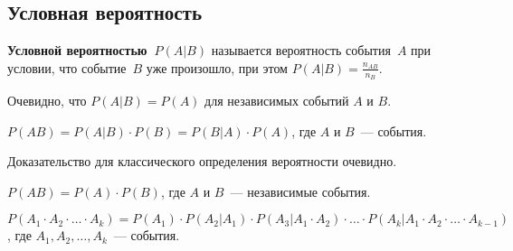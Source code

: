 \subsection{Условная вероятность}
 \textbf{Условной вероятностью~$P(A \vert B)$} называется вероятность события~$A$ при условии, что событие~$B$ уже произошло, при этом $P(A \vert B) = \frac{n_{AB}}{n_B}$.

Очевидно, что $P(A \vert B) = P(A)$ для независимых событий $A$ и $B$.

\begin{theorem}
$P(AB) = P(A \vert B) \cdot P(B) = P(B \vert A) \cdot P(A)$, где $A$ и $B$~--- события.
\end{theorem}%
Доказательство для классического определения вероятности очевидно.

\begin{consequent}
$P(AB) = P(A) \cdot P(B)$, где $A$ и $B$~--- независимые события.
\end{consequent}

\begin{theorem}
$P(A_1 \cdot A_2 \cdot \ldots \cdot A_k) = P(A_1) \cdot P(A_2 \vert A_1) \cdot P(A_3 \vert A_1 \cdot A_2) \cdot \ldots \cdot P(A_k \vert A_1 \cdot A_2 \cdot \ldots \cdot A_{k-1})$, где $A_1, A_2, \ldots, A_k$~--- события.
\end{theorem}
